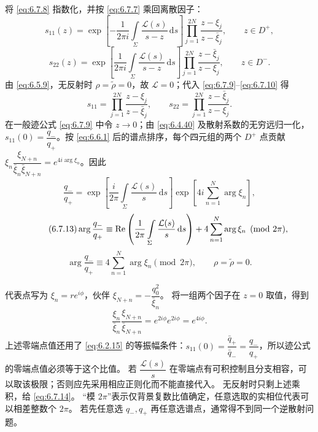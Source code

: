 \documentclass[lang=cn,scheme=chinese,mode=simple,device=normal,color=blue,
math=cm,thmcnt=section,12pt]{elegantbook}
\newcommand{\dd}{\,\mathrm{d}}
\newcommand{\eqq}[2]{\tag{#1}\label{eq:#1}#2}
\begin{document}
将 \eqref{eq:6.7.8} 指数化，并按 \eqref{eq:6.7.7} 乘回离散因子：
\begin{equation}\eqq{6.7.9}{s_{11}(z)=
        \exp\left[-\dfrac{1}{2\pi i}\int\limits_\Sigma\dfrac{\mathcal L(s)}{s-z}\dd s\right]
        \prod\limits_{j=1}^{2N}\dfrac{z-\xi_j}{z-\bar\xi_j},\qquad z\in D^+,}\end{equation}
\begin{equation}\eqq{6.7.10}{s_{22}(z)=
        \exp\left[\dfrac{1}{2\pi i}\int\limits_\Sigma\dfrac{\mathcal L(s)}{s-z}\dd s\right]
        \prod\limits_{j=1}^{2N}\dfrac{z-\bar\xi_j}{z-\xi_j},\qquad z\in D^-.}\end{equation}
由 \eqref{eq:6.5.9}，无反射时 $\rho=\widetilde\rho=0$，故 $\mathcal L=0$；代入 \eqref{eq:6.7.9}--\eqref{eq:6.7.10} 得
\begin{equation}\eqq{6.7.11}{s_{11}=\prod\limits_{j=1}^{2N}\dfrac{z-\xi_j}{z-\bar\xi_j},\qquad
        s_{22}=\prod\limits_{j=1}^{2N}\dfrac{z-\bar\xi_j}{z-\xi_j}.}\end{equation}
在一般迹公式 \eqref{eq:6.7.9} 中令 $z\to0$；由 \eqref{eq:6.4.40} 及散射系数的无穷远归一化，$s_{11}(0)=\dfrac{q_-}{q_+}$。按 \eqref{eq:6.6.1} 后的谱点排序，每个四元组的两个 $D^+$ 点贡献
$\xi_n\dfrac{\xi_{N+n}}{\bar\xi_n\bar\xi_{N+n}}=e^{4i\arg\xi_n}$。因此
\begin{equation}\eqq{6.7.12}{\dfrac{q_-}{q_+}=
        \exp\left[\dfrac{i}{2\pi}\int\limits_\Sigma\dfrac{\mathcal L(s)}{s}\dd s\right]
        \exp\left[4i\sum\limits_{n=1}^N\arg\xi_n\right],}\end{equation}
\begin{equation}\eqq{6.7.13}{\arg\dfrac{q_-}{q_+}\equiv
        \Ree\left(\dfrac{1}{2\pi}\int\limits_\Sigma\dfrac{\mathcal L(s)}{s}\dd s\right)
        +4\sum\limits_{n=1}^N\arg\xi_n\pmod{2\pi},}\end{equation}
\begin{equation}\eqq{6.7.14}{\arg\dfrac{q_-}{q_+}\equiv4\sum\limits_{n=1}^N\arg\xi_n\pmod{2\pi},
        \qquad \rho=\widetilde\rho=0.}\end{equation}

\begin{callout}
    代表点写为 $\xi_n=re^{i\phi}$，伙伴 $\xi_{N+n}=-\dfrac{q_0^2}{\bar\xi_n}$。
    将一组两个因子在 $z=0$ 取值，得到
    \[
        \dfrac{\xi_n}{\bar\xi_n}\dfrac{\xi_{N+n}}{\bar\xi_{N+n}}
        =e^{2i\phi}e^{2i\phi}=e^{4i\phi}.
    \]
    上述零端点值还用了 \eqref{eq:6.2.15} 的等振幅条件：$s_{11}(0)=\dfrac{\bar q_+}{\bar q_-}=\dfrac{q_-}{q_+}$，所以迹公式的零端点值必须等于这个比值。
    若 $\dfrac{\mathcal L(s)}{s}$ 在零端点有可积控制且分支相容，可以取该极限；否则应先采用相应正则化而不能直接代入。
    无反射时只剩上述乘积，给 \eqref{eq:6.7.14}。
    “模 $2\pi$”表示仅背景复数比值确定，任意选取的实相位代表可以相差整数个 $2\pi$。
    若先任意选 $q_-,q_+$ 再任意选谱点，通常得不到同一个逆散射问题。

\end{callout}
\end{document}
